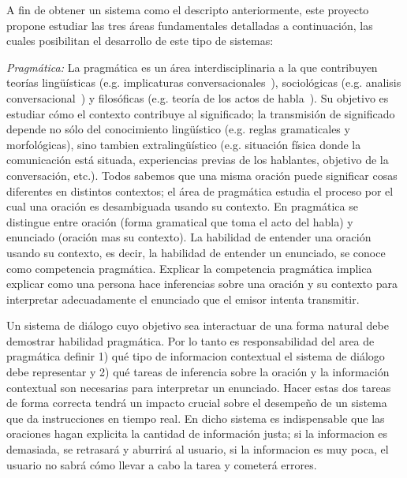 A fin de obtener un sistema como el descripto anteriormente, este proyecto propone estudiar las tres \'areas fundamentales detalladas a continuaci\'on, las cuales posibilitan el desarrollo de este tipo de sistemas:
\begin{myitemize}
  \item \emph{Pragm\'atica:} La pragm\'atica es un \'area interdisciplinaria a
la que contribuyen teor\'ias ling\"u\'isticas (e.g. implicaturas
conversacionales~\citep{Grice75}), sociol\'ogicas (e.g. analisis
conversacional~\citep{schegloff87b}) y filos\'oficas (e.g. teor\'ia de los actos
de habla~\citep{austin62}). Su objetivo es estudiar c\'omo el contexto
contribuye al significado; la transmisi\'on de significado depende no s\'olo del
conocimiento ling\"u\'istico (e.g. reglas gramaticales y morfol\'ogicas), sino
tambien extraling\"u\'istico (e.g. situaci\'on f\'isica donde la comunicaci\'on
est\'a situada, experiencias previas de los hablantes, objetivo de la
conversaci\'on, etc.). Todos sabemos que una misma oraci\'on puede significar
cosas diferentes en distintos contextos; el \'area de pragm\'atica estudia el
proceso por el cual una oraci\'on es desambiguada usando su contexto. En
pragm\'atica se distingue entre oraci\'on (forma
gramatical que toma el acto del habla) y enunciado (oraci\'on mas su contexto).
La habilidad de entender una oraci\'on usando su contexto, es decir, la
habilidad de entender un enunciado, se conoce como competencia pragm\'atica.
Explicar la competencia pragm\'atica implica explicar como una persona hace
inferencias sobre una oraci\'on y su contexto para interpretar adecuadamente el
enunciado que el emisor intenta transmitir. 

Un sistema de di\'alogo cuyo objetivo sea interactuar de una forma natural debe
demostrar habilidad pragm\'atica. Por lo tanto es responsabilidad del area de
pragm\'atica definir 1) qu\'e tipo de informacion contextual el sistema de
di\'alogo debe representar y 2) qu\'e tareas de inferencia sobre la oraci\'on y
la informaci\'on contextual son necesarias para interpretar un enunciado. Hacer
estas dos tareas de forma correcta tendr\'a un impacto crucial sobre el
desempe\~no de un sistema que da instrucciones en tiempo real. En dicho sistema
es indispensable que las oraciones hagan explicita la cantidad de informaci\'on
justa; si la informacion es demasiada, se retrasar\'a y aburrir\'a al usuario,
si la informacion es muy poca, el usuario no sabr\'a c\'omo llevar a cabo la
tarea y cometer\'a errores.  


% 
% 


\end{myitemize}
